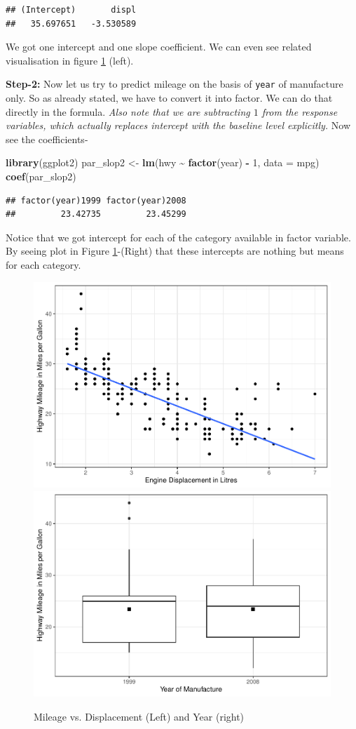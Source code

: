 \documentclass[
]{book}
\newenvironment{Shaded}{\begin{snugshade}}{\end{snugshade}}
\newcommand{\AttributeTok}[1]{\textcolor[rgb]{0.13,0.29,0.53}{#1}}
\newcommand{\DecValTok}[1]{\textcolor[rgb]{0.00,0.00,0.81}{#1}}
\newcommand{\FunctionTok}[1]{\textcolor[rgb]{0.13,0.29,0.53}{\textbf{#1}}}
\newcommand{\NormalTok}[1]{#1}
\newcommand{\OtherTok}[1]{\textcolor[rgb]{0.56,0.35,0.01}{#1}}
\newcommand{\SpecialCharTok}[1]{\textcolor[rgb]{0.81,0.36,0.00}{\textbf{#1}}}
\begin{document}
\begin{verbatim}
## (Intercept)       displ 
##   35.697651   -3.530589
\end{verbatim}

We got one intercept and one slope coefficient. We can even see related visualisation in figure \ref{fig:parrslop} (left).

\textbf{Step-2:} Now let us try to predict mileage on the basis of \texttt{year} of manufacture only. So as already stated, we have to convert it into factor. We can do that directly in the formula. \emph{Also note that we are subtracting \(1\) from the response variables, which actually replaces intercept with the baseline level explicitly.} Now see the coefficients-

\begin{Shaded}
\begin{Highlighting}[]
\FunctionTok{library}\NormalTok{(ggplot2)}
\NormalTok{par\_slop2 }\OtherTok{\textless{}{-}} \FunctionTok{lm}\NormalTok{(hwy }\SpecialCharTok{\textasciitilde{}} \FunctionTok{factor}\NormalTok{(year) }\SpecialCharTok{{-}} \DecValTok{1}\NormalTok{, }\AttributeTok{data =}\NormalTok{ mpg)}
\FunctionTok{coef}\NormalTok{(par\_slop2)}
\end{Highlighting}
\end{Shaded}

\begin{verbatim}
## factor(year)1999 factor(year)2008 
##         23.42735         23.45299
\end{verbatim}

Notice that we got intercept for each of the category available in factor variable. By seeing plot in Figure \ref{fig:parrslop}-(Right) that these intercepts are nothing but means for each category.

\begin{figure}

{\centering \includegraphics[width=0.47\linewidth]{DauR_files/figure-latex/parrslop-1} \includegraphics[width=0.47\linewidth]{DauR_files/figure-latex/parrslop-2} 

}

\caption{Mileage vs. Displacement (Left) and Year (right)}\label{fig:parrslop}
\end{figure}
\end{document}
